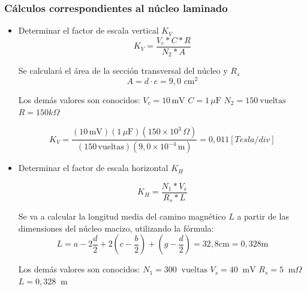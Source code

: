 \subsubsection{Cálculos correspondientes al núcleo laminado}
\begin{itemize}
    \item Determinar el factor de escala vertical $K_V$
        \begin{equation}
            K_V = \frac{V_{c}*C*R}{N_{2}*A}
        \end{equation}
    
    Se calculará el área de la sección transversal del núcleo y $R_s$
    \begin{equation}
        A = d \cdot e = 9,0 \text{ cm}^2  
    \end{equation}

    Los demás valores son conocidos: \newline
    $V_c = 10\,\text{mV}$                    \newline
    $C = 1\,\mu\text{F}$                  \newline
    $N_2 = 150\ \text{vueltas}$              \newline
    $R = 150 k\Omega$                          \newline

    \begin{equation}
            K_V = \frac{(10\,\text{mV})(1\,\mu\text{F})(150 \times 10^3\,\Omega)}{(150\,\text{vueltas})(9,0 \times 10^{-4}\,\text{m})} = 0,011 [Tesla/div]
    \end{equation}

    \item Determinar el factor de escala horizontal $K_H$
    
        \begin{equation}
            K_H = \frac{N_1*V_s}{R_s*L}
        \end{equation}

    Se va a calcular la longitud media del camino magnético $L$ a partir de las dimensiones del núcleo macizo, utilizando la fórmula:
    \begin{equation}
        L = a - 2\frac{d}{2} + 2(c-\frac{b}{2}) + (g-\frac{d}{2}) = 32,8 \text{cm}= 0,328 \text{m}
    \end{equation}

    Los demás valores son conocidos: \newline
    $N_1 = 300\ \text{ vueltas}$      \newline
    $V_s = 40\ \text{ mV}$            \newline
    $R_s = 5\ \text{ m}\Omega$         \newline
    $L = 0,328\ \text{ m}$            \newline


\end{itemize}

